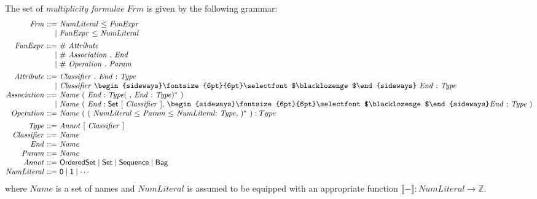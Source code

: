 \documentclass[10pt, a4paper]{isov2}
\newcommand{\composition}{\raisebox{0.2pt}{\begin{sideways}\fontsize{6pt}{6pt}\selectfont$\blacklozenge$\end{sideways}}}
\newcommand{\NZ}{\mathbb{Z}}
\newcommand{\sem}[1]{\mathopen\llbracket#1\mathclose\rrbracket}
\begin{document}
The set of \emph{multiplicity formulae} $\mathit{Frm}$ is given by
the following grammar:
%
\begin{equation*}
\begin{array}{@{}r@{\ }r@{\ }l@{}}
  \mathit{Frm} & ::= & \mathit{NumLiteral}\ \mathsf{\leq}\ \mathit{FunExpr}\\
               &   | & \mathit{FunExpr}\ \mathsf{\leq}\ \mathit{NumLiteral}
\\[1ex]
  \mathit{FunExpr} & ::= & \mathit{\#}\ \mathit{Attribute}\\
                   &   | & \mathit{\#}\ \mathit{Association}\ \mathsf{.}\ \mathit{End}\\
                   &   | & \mathit{\#}\ \mathit{Operation}\ \mathsf{.}\ \mathit{Param}
\\[1ex]
  \mathit{Attribute} & ::= & \mathit{Classifier}\ \mathsf{.}\ \mathit{End}\ \mathsf{:}\ \mathit{Type}\\
                     &   | & \mathit{Classifier}\ \composition\ \mathit{End}\ \mathsf{:}\ \mathit{Type}
\\
  \mathit{Association} & ::= & \mathit{Name}\ (\ \mathit{End} : \mathit{Type}(\ \mathsf{,}\ \mathit{End}\ \mathsf{:}\ \mathit{Type})^*\ )\\
                       &   | & \mathit{Name}\ (\ \mathit{End} : \mathsf{Set}\ [\ \mathit{Classifier}\ ]\mathsf{,}\ \composition \mathit{End}\ \mathsf{:}\ \mathit{Type}\ )
\\
  \mathit{Operation} & ::= & \mathit{Name}\ (\  (\  \mathit{NumLiteral}\ \mathsf{\leq}\ \mathit{Param}\  \mathsf{\leq}\ \mathit{NumLiteral} \mathsf{:}\ \mathit{Type} \mathsf{,}\ )^*\ ) : Type
\\[1ex]
  \mathit{Type} & ::= & \mathit{Annot}\ \mathsf{[}\ \mathit{Classifier}\ \mathsf{]}
\\
  \mathit{Classifier} & ::= & \mathit{Name}
\\
  \mathit{End} & ::= & \mathit{Name}
\\
  \mathit{Param} & ::= & \mathit{Name}
\\
  \mathit{Annot} & ::= & \mathsf{OrderedSet} \mid \mathsf{Set} \mid \mathsf{Sequence} \mid \mathsf{Bag}
\\
  \mathit{NumLiteral} & ::= & \mathsf{0} \mid \mathsf{1} \mid \cdots
\end{array}
\end{equation*}
%
where $\mathit{Name}$ is a set of names and $\mathit{NumLiteral}$ is
assumed to be equipped with an appropriate function
$\sem{-} : \mathit{NumLiteral} \to \NZ$.
\end{document}
